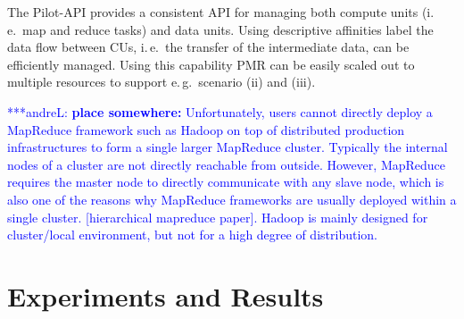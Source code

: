 \documentclass{acm_proc_article-sp}
\newcommand{\alnote}[1]{ {\textcolor{blue} { ***andreL: #1 }}}
\newcommand{\alnote}[1]{}
\newcommand{\pilotmapreduce}{Pilot-MapReduce\xspace}
\begin{document}
The Pilot-API provides a consistent API for managing both compute units (i.\,e.\ 
map and reduce tasks) and data units. Using descriptive affinities label the  
data flow between CUs, i.\,e.\ the transfer of the intermediate data, can be 
efficiently managed. Using this capability PMR can be easily scaled out to 
multiple resources to support e.\,g.\ scenario (ii) and (iii). 



\alnote{\textbf{place somewhere:} Unfortunately, users cannot directly deploy a MapReduce framework such as Hadoop
on top of distributed production infrastructures to form a single larger
MapReduce cluster. Typically the internal nodes of a cluster are not directly
reachable from outside. However, MapReduce requires the master node to directly
communicate with any slave node, which is also one of the reasons why MapReduce
frameworks are usually deployed within a single cluster. [hierarchical mapreduce
paper]. Hadoop is mainly designed for cluster/local environment, but not for a
high degree of distribution.}




\section{Experiments and Results}
\label{sec-experiments}
\end{document}
